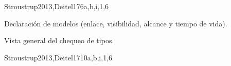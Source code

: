 \begin{syllabus}
\begin{unit}{\PLBasicTypeSystems}{}{Stroustrup2013,Deitel17}{6}{a,b,i,1,6}
    \begin{topics}
        \item \PLBasicTypeSystemsTopicA        
        \item Declaración de modelos (enlace, visibilidad, alcance y tiempo de vida).
        \item Vista general del chequeo de tipos.
    \end{topics}
    \begin{learningoutcomes}
        \item \PLBasicTypeSystemsLOForBoth [\Familiarity] 
        \item \PLBasicTypeSystemsLOForA [\Familiarity] 
        \item \PLBasicTypeSystemsLODescribeExamples [\Familiarity] 
        \item \PLBasicTypeSystemsLOForMultiple [\Usage] 
        \item \PLBasicTypeSystemsLOGiveAnThat [\Familiarity] 
        \item \PLBasicTypeSystemsLOUseTypes [\Usage] 
        \item \PLBasicTypeSystemsLOExplainHowDefine [\Familiarity] 
        \item \PLBasicTypeSystemsLOWriteDown [\Usage] 
        \item \PLBasicTypeSystemsLOExplainWhyType [\Familiarity] 
        \item \PLBasicTypeSystemsLODefineAndPieces [\Usage] 
        \item \PLBasicTypeSystemsLODiscussTheGenerics [\Familiarity] 
        \item \PLBasicTypeSystemsLOExplainMultiple [\Familiarity] 
    \end{learningoutcomes}
\end{unit}

\begin{unit}{\SDFFundamentalProgrammingConcepts}{}{Stroustrup2013,Deitel17}{10}{a,b,i,1,6}
    \begin{topics}
        \item \PLObjectOrientedProgrammingTopicObject\item \PLBasicTypeSystemsLOForBoth [\Familiarity] 
        \item \SDFFundamentalProgrammingConceptsTopicBasic
        \item \SDFFundamentalProgrammingConceptsTopicVariables
        \item \SDFFundamentalProgrammingConceptsTopicExpressions
        \item \SDFFundamentalProgrammingConceptsTopicConditional


\end{topics}
\end{unit}
\end{syllabus}

